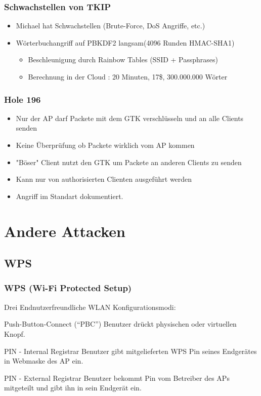 \documentclass{beamer}
\begin{document}
\begin{frame}
\frametitle{Schwachstellen von TKIP}
\begin{itemize}
	\item Michael hat Schwachstellen (Brute-Force, DoS Angriffe, etc.)
	\item Wörterbuchangriff auf PBKDF2 langsam(4096 Runden HMAC-SHA1)
	\begin{itemize}
		\item Beschleunigung durch Rainbow Tables \cite{renderlab} (SSID + Passphrases)
		\item Berechnung in der Cloud \cite{cloudcracker}: 20 Minuten, 17\$, 300.000.000 Wörter
	\end{itemize}
\end{itemize}
\end{frame}


\begin{frame}
\frametitle{Hole 196}
\begin{itemize}
	\item Nur der AP darf Packete mit dem GTK verschlüsseln und an alle Clients senden
	\item Keine Überprüfung ob Packete wirklich vom AP kommen
    \item "Böser" Client nutzt den GTK um Packete an anderen Clients zu senden
	\item Kann nur von authorisierten Clienten ausgeführt werden
	\item Angriff im Standart dokumentiert.
\end{itemize}
\end{frame}

\section{Andere Attacken}
\subsection{WPS}

\begin{frame}
\frametitle{WPS (Wi-Fi Protected Setup)}
Drei Endnutzerfreundliche WLAN Konfigurationsmodi:
\begin{block}{Push-Button-Connect (“PBC”)}
Benutzer drückt physischen oder virtuellen Knopf.
\end{block}
\begin{block}{PIN - Internal Registrar}
Benutzer gibt mitgelieferten WPS Pin seines Endgerätes in Webmaske des AP ein.
\end{block}
\begin{block}{PIN - External Registrar}
Benutzer bekommt Pin vom Betreiber des APs mitgeteilt und gibt ihn in sein Endgerät ein.
\end{block}
\end{frame}
\end{document}
